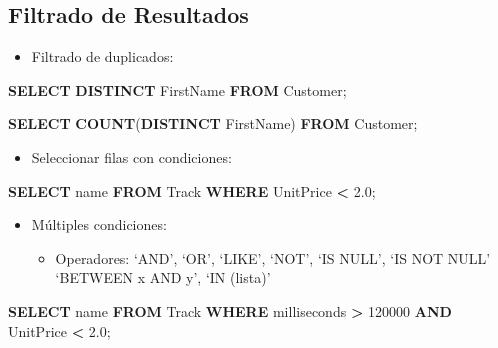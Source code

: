 \documentclass[
]{book}
\newenvironment{Shaded}{\begin{snugshade}}{\end{snugshade}}
\newcommand{\DecValTok}[1]{\textcolor[rgb]{0.00,0.00,0.81}{#1}}
\newcommand{\FloatTok}[1]{\textcolor[rgb]{0.00,0.00,0.81}{#1}}
\newcommand{\FunctionTok}[1]{\textcolor[rgb]{0.13,0.29,0.53}{\textbf{#1}}}
\newcommand{\KeywordTok}[1]{\textcolor[rgb]{0.13,0.29,0.53}{\textbf{#1}}}
\newcommand{\NormalTok}[1]{#1}
\newcommand{\OperatorTok}[1]{\textcolor[rgb]{0.81,0.36,0.00}{\textbf{#1}}}
\providecommand{\tightlist}{%
  \setlength{\itemsep}{0pt}\setlength{\parskip}{0pt}}
\theoremstyle{break}
\theoremstyle{nonumberplain}
\begin{document}
\subsection{Filtrado de Resultados}\label{filtrado-de-resultados}

\begin{itemize}
\tightlist
\item
  Filtrado de duplicados:
\end{itemize}

\begin{Shaded}
\begin{Highlighting}[]
  \KeywordTok{SELECT} \KeywordTok{DISTINCT}\NormalTok{ FirstName }\KeywordTok{FROM}\NormalTok{ Customer; }

  \KeywordTok{SELECT} \FunctionTok{COUNT}\NormalTok{(}\KeywordTok{DISTINCT}\NormalTok{ FirstName) }\KeywordTok{FROM}\NormalTok{ Customer; }
\end{Highlighting}
\end{Shaded}

\begin{itemize}
\tightlist
\item
  Seleccionar filas con condiciones:
\end{itemize}

\begin{Shaded}
\begin{Highlighting}[]
\KeywordTok{SELECT}\NormalTok{ name }\KeywordTok{FROM}\NormalTok{ Track}
\KeywordTok{WHERE}\NormalTok{ UnitPrice }\OperatorTok{\textless{}} \FloatTok{2.0}\NormalTok{; }
\end{Highlighting}
\end{Shaded}

\begin{itemize}
\item
  Múltiples condiciones:

  \begin{itemize}
  \tightlist
  \item
    Operadores: `AND', `OR', `LIKE', `NOT', `IS NULL', `IS NOT NULL'
    `BETWEEN x AND y', `IN (lista)'
  \end{itemize}
\end{itemize}

\begin{Shaded}
\begin{Highlighting}[]
  \KeywordTok{SELECT}\NormalTok{ name }\KeywordTok{FROM}\NormalTok{ Track}
  \KeywordTok{WHERE}\NormalTok{ milliseconds }\OperatorTok{\textgreater{}} \DecValTok{120000} \KeywordTok{AND}\NormalTok{ UnitPrice }\OperatorTok{\textless{}} \FloatTok{2.0}\NormalTok{; }
\end{Highlighting}
\end{Shaded}
\end{document}
